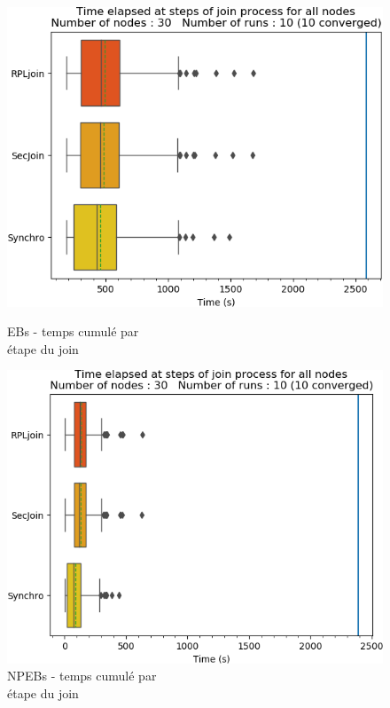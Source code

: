 \documentclass[]{report}
\begin{document}
\begin{figure}[!ht]
	\begin{minipage}{0.49\textwidth}
		\centering
		\includegraphics[width=\textwidth]{results/EB/phase_times}
		\caption{EBs - temps cumulé par\\ \noindent étape du join}
		\label{fig:EBtimes}
	\end{minipage}\hfill
	\begin{minipage}{0.5\textwidth}
		\centering
		\includegraphics[width=\textwidth]{results/NPEB/phase_times}
		\caption{NPEBs - temps cumulé par\\ étape du join}
		\label{fig:NPEBtimes}
	\end{minipage}	
\end{figure}
\end{document}

